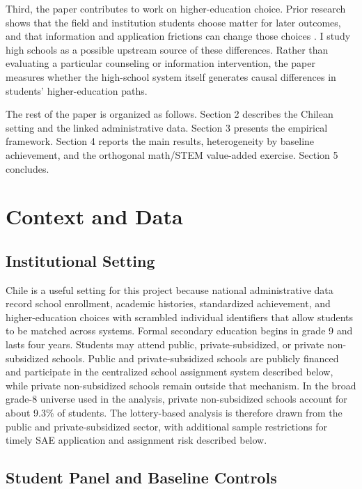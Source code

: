 \documentclass[a4paper, article, english, oneside, unknownkeysallowed, 12pt]{memoir}
\begin{document}
Third, the paper contributes to work on higher-education choice.
Prior research shows that the field and institution students choose matter for later outcomes, and that information and application frictions can change those choices \parencite{kirkeboen_field_2016, hoxby_what_2015, dynarski_closing_2021, hastings_informed_2016, chetty_diversifying_2025}.
I study high schools as a possible upstream source of these differences.
Rather than evaluating a particular counseling or information intervention, the paper measures whether the high-school system itself generates causal differences in students' higher-education paths.

The rest of the paper is organized as follows.
Section 2 describes the Chilean setting and the linked administrative data.
Section 3 presents the empirical framework.
Section 4 reports the main results, heterogeneity by baseline achievement, and the orthogonal math/STEM value-added exercise.
Section 5 concludes.

\clearpage
\section{Context and Data}

\subsection{Institutional Setting}

Chile is a useful setting for this project because national administrative data record school enrollment, academic histories, standardized achievement, and higher-education choices with scrambled individual identifiers that allow students to be matched across systems.
Formal secondary education begins in grade 9 and lasts four years.
Students may attend public, private-subsidized, or private non-subsidized schools.
Public and private-subsidized schools are publicly financed and participate in the centralized school assignment system described below, while private non-subsidized schools remain outside that mechanism.
In the broad grade-8 universe used in the analysis, private non-subsidized schools account for about 9.3\% of students.
The lottery-based analysis is therefore drawn from the public and private-subsidized sector, with additional sample restrictions for timely SAE application and assignment risk described below.

\subsection{Student Panel and Baseline Controls}
\end{document}

